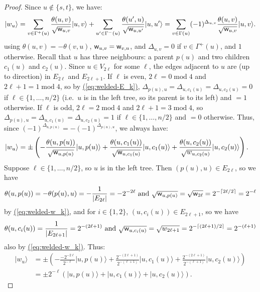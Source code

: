 \documentclass{article}
\newcommand{\eq}[1]{\hyperref[eq:#1]{(\ref*{eq:#1})}}
\def\ket#1{{\lvert}#1\rangle}
\renewcommand{\>}{\rangle}
\newcommand{\<}{\langle}
\renewcommand{\(}{\left(}
\renewcommand{\)}{\right)}
\def\w{{\sf w}}
\begin{document}
\begin{proof}
Since $u\not\in \{s,t\}$, we have:
\begin{align*}
\ket{w_u} = \sum_{v\in\Gamma^+(u)}\frac{\theta(u,v)}{\sqrt{\w_{u,v}}}\ket{u,v}+\sum_{u'\in\Gamma^-(u)}\frac{\theta(u',u)}{\sqrt{\w_{u,u'}}}\ket{u,u'}
= \sum_{v\in\Gamma(u)}(-1)^{\Delta_{u,v}}\frac{\theta(u,v)}{\sqrt{\w_{u,v}}}\ket{u,v}.
\end{align*}
using $\theta(u,v)=-\theta(v,u)$, $\w_{u,v}=\w_{v,u}$, and $\Delta_{u,v}=0$ if $v\in\Gamma^+(u)$, and $1$ otherwise.
Recall that $u$ has three neighbours: a parent $p(u)$ and two children $c_1(u)$ and $c_2(u)$.
Since $u\in V_{2\ell}$ for some $\ell$, the edges adjacent to $u$ are (up to direction) in $E_{2\ell}$ and $E_{2\ell+1}$. If $\ell$ is even, $2\ell=0\;\mathrm{mod}\; 4$ and $2\ell+1=1\;\mathrm{mod}\; 4$, so by \eq{welded-E_k}, $\Delta_{p(u),u}=\Delta_{u,c_1(u)}=\Delta_{u,c_2(u)}=0$ if $\ell\in\{1,\dots,n/2\}$ (i.e.~$u$ is in the left tree, so its parent is to its left) and $=1$ otherwise. If $\ell$ is odd, $2\ell=2\;\mathrm{mod}\; 4$ and $2\ell+1=3\;\mathrm{mod}\; 4$, so $\Delta_{p(u),u}=\Delta_{u,c_1(u)}=\Delta_{u,c_2(u)}=1$ if $\ell\in\{1,\dots,n/2\}$ and $=0$ otherwise. Thus, since $(-1)^{\Delta_{u,p(u)}}=-(-1)^{\Delta_{p(u),u}}$, we always have:
\begin{align*}
\ket{w_u} &= \pm\left(-\frac{\theta(u,p(u))}{\sqrt{\w_{u,p(u)}}}\ket{u,p(u)}+\frac{\theta(u,c_1(u))}{\sqrt{\w_{u,c_1(u)}}}\ket{u,c_1(u)}+\frac{\theta(u,c_2(u))}{\sqrt{w_{u,c_2(u)}}}\ket{u,c_2(u)}\right).
\end{align*}
Suppose $\ell\in\{1,\dots,n/2\}$, so $u$ is in the left tree. Then $(p(u),u)\in E_{2\ell}$, so we have
$$\theta(u,p(u))=-\theta(p(u),u)=-\frac{1}{|E_{2\ell}|}=-2^{-2\ell}
\mbox{ and }
\sqrt{\w_{u,p(u)}}=\sqrt{\w_{2\ell}}=2^{-\lceil 2\ell/2\rceil }=2^{-\ell}$$
by \eq{welded-w_k}, and for $i\in\{1,2\}$, $(u,c_i(u))\in E_{2\ell+1}$, so we have
$$\theta(u,c_i(u))=\frac{1}{|E_{2\ell+1}|}=2^{-(2\ell+1)}
\mbox{ and }
\sqrt{\w_{u,c_i(u)}}=\sqrt{w_{2\ell+1}} = 2^{-\lceil (2\ell+1)/2\rceil }=2^{-(\ell+1)}
$$
also by \eq{welded-w_k}. Thus:
\begin{align*}
\ket{w_u} &= \pm\left( -\frac{-2^{-2\ell}}{2^{-\ell}}\ket{u,p(u)}+\frac{2^{-(2\ell+1)}}{2^{-(\ell+1)}}\ket{u,c_1(u)}+\frac{2^{-(2\ell+1)}}{2^{-(\ell+1)}}\ket{u,c_2(u)}\right)\\
&=\pm 2^{-\ell}\left(\ket{u,p(u)}+\ket{u,c_1(u)}+\ket{u,c_2(u)}\right).
\end{align*}


\end{proof}
\end{document}

